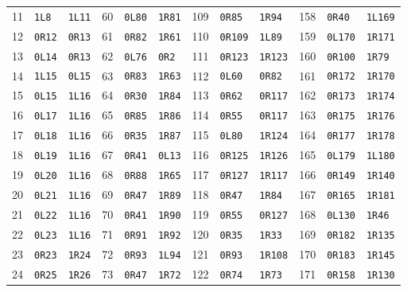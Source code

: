 \begin{center}
\begin{tabular}{@{}rll@{\hspace{12pt}}rll@{\hspace{12pt}}rll@{\hspace{12pt}}rll@{}}
11 & \texttt{1L8} & \texttt{1L11} & 60 & \texttt{0L80} & \texttt{1R81} & 109 & \texttt{0R85} & \texttt{1R94} & 158 & \texttt{0R40} & \texttt{1L169}\\
12 & \texttt{0R12} & \texttt{0R13} & 61 & \texttt{0R82} & \texttt{1R61} & 110 & \texttt{0R109} & \texttt{1L89} & 159 & \texttt{0L170} & \texttt{1R171}\\
13 & \texttt{0L14} & \texttt{0R13} & 62 & \texttt{0L76} & \texttt{0R2} & 111 & \texttt{0R123} & \texttt{1R123} & 160 & \texttt{0R100} & \texttt{1R79}\\
14 & \texttt{1L15} & \texttt{0L15} & 63 & \texttt{0R83} & \texttt{1R63} & 112 & \texttt{0L60} & \texttt{0R82} & 161 & \texttt{0R172} & \texttt{1R170}\\
15 & \texttt{0L15} & \texttt{1L16} & 64 & \texttt{0R30} & \texttt{1R84} & 113 & \texttt{0R62} & \texttt{0R117} & 162 & \texttt{0R173} & \texttt{1R174}\\
16 & \texttt{0L17} & \texttt{1L16} & 65 & \texttt{0R85} & \texttt{1R86} & 114 & \texttt{0R55} & \texttt{0R117} & 163 & \texttt{0R175} & \texttt{1R176}\\
17 & \texttt{0L18} & \texttt{1L16} & 66 & \texttt{0R35} & \texttt{1R87} & 115 & \texttt{0L80} & \texttt{1R124} & 164 & \texttt{0R177} & \texttt{1R178}\\
18 & \texttt{0L19} & \texttt{1L16} & 67 & \texttt{0R41} & \texttt{0L13} & 116 & \texttt{0R125} & \texttt{1R126} & 165 & \texttt{0L179} & \texttt{1L180}\\
19 & \texttt{0L20} & \texttt{1L16} & 68 & \texttt{0R88} & \texttt{1R65} & 117 & \texttt{0R127} & \texttt{1R117} & 166 & \texttt{0R149} & \texttt{1R140}\\
20 & \texttt{0L21} & \texttt{1L16} & 69 & \texttt{0R47} & \texttt{1R89} & 118 & \texttt{0R47} & \texttt{1R84} & 167 & \texttt{0R165} & \texttt{1R181}\\
21 & \texttt{0L22} & \texttt{1L16} & 70 & \texttt{0R41} & \texttt{1R90} & 119 & \texttt{0R55} & \texttt{0R127} & 168 & \texttt{0L130} & \texttt{1R46}\\
22 & \texttt{0L23} & \texttt{1L16} & 71 & \texttt{0R91} & \texttt{1R92} & 120 & \texttt{0R35} & \texttt{1R33} & 169 & \texttt{0R182} & \texttt{1R135}\\
23 & \texttt{0R23} & \texttt{1R24} & 72 & \texttt{0R93} & \texttt{1L94} & 121 & \texttt{0R93} & \texttt{1R108} & 170 & \texttt{0R183} & \texttt{1R145}\\
24 & \texttt{0R25} & \texttt{1R26} & 73 & \texttt{0R47} & \texttt{1R72} & 122 & \texttt{0R74} & \texttt{1R73} & 171 & \texttt{0R158} & \texttt{1R130}\\

\end{tabular}
\end{center}
